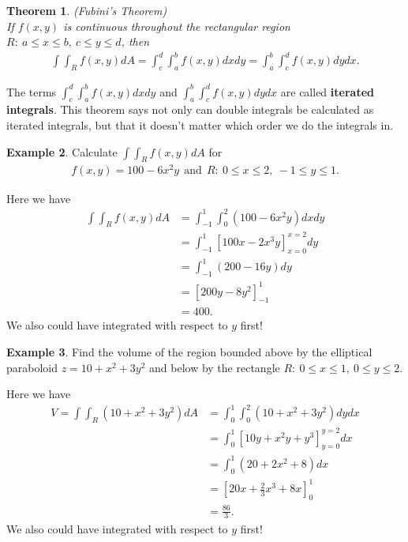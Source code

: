 \documentclass[12pt, letter]{article}
\theoremstyle{plain}
\newtheorem{theorem}{Theorem}
\numberwithin{theorem}{section}
\theoremstyle{definition}
\newtheorem{example}[theorem]{Example}
\begin{document}
\begin{theorem}{(Fubini's Theorem)}
\\
If $f(x,y)$ is continuous throughout the rectangular region $R: \ a\leq x\leq b, \ c\leq y\leq d$, then
\begin{align*}
\int \int_R f(x,y) dA = \int_c^d \int_a^b f(x,y)dx dy = \int_a^b \int_c^d f(x,y)dydx.
\end{align*}
\end{theorem}

\bigskip

The terms $\int_c^d \int_a^b f(x,y)dx dy$ and  $\int_a^b \int_c^d f(x,y)dydx$ are called \textbf{iterated integrals}. This theorem says not only can double integrals be calculated as iterated integrals, but that it doesn't matter which order we do the integrals in.

\bigskip

\hrulefill

\bigskip

\begin{example}
Calculate $\int \int_R f(x,y) dA$ for
\begin{align*}
f(x,y) = 100-6x^2y \ \ \text{and} \ \ R: \ 0\leq x \leq 2, \ -1 \leq y \leq 1.
\end{align*}

\bigskip

Here we have
\begin{align*}
\int \int_R f(x,y) dA &= \int_{-1}^1 \int_0^2 (100-6x^2y)dxdy\\
&= \int_{-1}^1 \left[100x-2x^3y\right]_{x=0}^{x=2} dy\\
&= \int_{-1}^1 (200-16y)dy\\
&=\left[200y-8y^2\right]_{-1}^1\\
&=400.
\end{align*}
We also could have integrated with respect to $y$ first!
\end{example}

\bigskip

\hrulefill

\bigskip

\begin{example}
Find the volume of the region bounded above by the elliptical paraboloid $z=10+x^2+3y^2$ and below by the rectangle $R: \ 0\leq x \leq 1, \ 0\leq y \leq 2$.

\bigskip

Here we have
\begin{align*}
V= \int \int_R (10+x^2+3y^2) dA 
&= \int_0^1 \int_0^2 (10+x^2+3y^2)dydx\\
&= \int_0^1 \left[10y+x^2y+y^3\right]_{y=0}^{y=2} dx\\
&= \int_0^1 (20+2x^2+8)dx\\
&=\left[20x+\frac{2}{3}x^3+8x\right]_0^1\\
&=\frac{86}{3}.
\end{align*}
We also could have integrated with respect to $y$ first!
\end{example}
\end{document}
